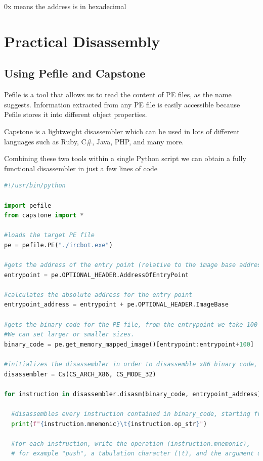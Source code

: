 \documentclass[]{project_plan}
\begin{document}
0x means the address is in hexadecimal

\section{Practical Disassembly}
\subsection{Using Pefile and Capstone}
Pefile is a tool that allows us to read the content of PE files, as the name
suggests. Information extracted from any PE file is easily accessible because
Pefile stores it into different object properties.

Capstone is a lightweight disassembler which can be used in lots of different languages such as Ruby, C\#,
Java, PHP, and many more.

Combining these two tools within a single Python script we can obtain a
fully functional disassembler in just a few lines of code

\begin{lstlisting}[language=python]
  #!/usr/bin/python

import pefile
from capstone import *

#loads the target PE file
pe = pefile.PE("./ircbot.exe")

#gets the address of the entry point (relative to the image base address) from the "optional header"
entrypoint = pe.OPTIONAL_HEADER.AddressOfEntryPoint

#calculates the absolute address for the entry point
entrypoint_address = entrypoint + pe.OPTIONAL_HEADER.ImageBase

#gets the binary code for the PE file, from the entrypoint we take 100 bytes.
#We can set larger or smaller sizes.
binary_code = pe.get_memory_mapped_image()[entrypoint:entrypoint+100]

#initializes the disassembler in order to disassemble x86 binary code, with 32 bit words
disassembler = Cs(CS_ARCH_X86, CS_MODE_32)

for instruction in disassembler.disasm(binary_code, entrypoint_address):

  #disassembles every instruction contained in binary_code, starting from entrypoint_address
  print(f"{instruction.mnemonic}\t{instruction.op_str}")

  #for each instruction, write the operation (instruction.mnemonic),
  # for example "push", a tabulation character (\t), and the argument of the instruction (instruction.op_str), for example "0x2832c4"
\end{lstlisting}
\end{document}
